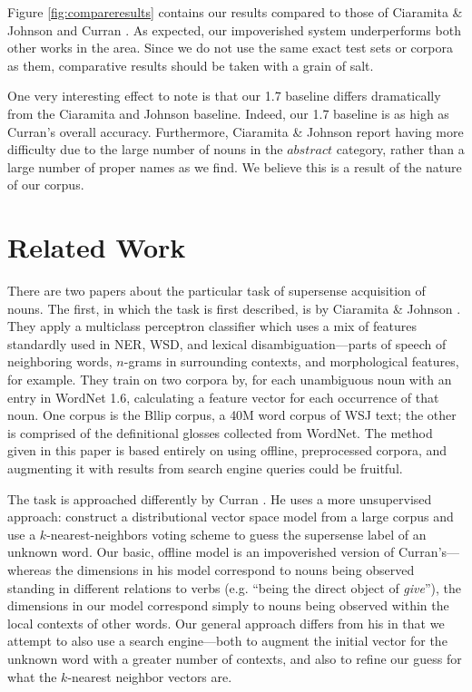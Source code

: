 \documentclass{article}
\begin{document}
Figure \ref{fig:compareresults} contains our results compared to those of Ciaramita \& Johnson \cite{cj} and Curran \cite{curran}.
As expected, our impoverished system underperforms both other works in the area.
Since we do not use the same exact test sets or corpora as them, comparative results should be taken with a grain of salt.

One very interesting effect to note is that our 1.7 baseline differs dramatically from the Ciaramita and Johnson baseline. 
Indeed, our 1.7 baseline is as high as Curran's overall accuracy.
Furthermore, Ciaramita \& Johnson report having more difficulty due to the large number of nouns in the $abstract$ category, rather than a large number of proper names as we find.
We believe this is a result of the nature of our corpus.


\section{Related Work}


There are two papers about the particular task of supersense acquisition of nouns.
The first, in which the task is first described, is by Ciaramita \& Johnson \cite{cj}.
They apply a multiclass perceptron classifier which uses a mix of features standardly used in NER, WSD, and lexical disambiguation---parts of speech of neighboring words, $n$-grams in surrounding contexts, and morphological features, for example.
They train on two corpora by, for each unambiguous noun with an entry in WordNet 1.6, calculating a feature vector for each occurrence of that noun.
One corpus is the Bllip corpus, a 40M word corpus of WSJ text; the other is comprised of the definitional glosses collected from WordNet.
The method given in this paper is based entirely on using offline, preprocessed corpora, and augmenting it with results from search engine queries could be fruitful.

The task is approached differently by Curran \cite{curran}.
He uses a more unsupervised approach: construct a distributional vector space model from a large corpus and use a $k$-nearest-neighbors voting scheme to guess the supersense label of an unknown word.
Our basic, offline model is an impoverished version of Curran's---whereas the dimensions in his model correspond to nouns being observed standing in different relations to verbs (e.g. ``being the direct object of {\it give}''), the dimensions in our model correspond simply to nouns being observed within the local contexts of other words.
Our general approach differs from his in that we attempt to also use a search engine---both to augment the initial vector for the unknown word with a greater number of contexts, and also to refine our guess for what the $k$-nearest neighbor vectors are.
\end{document}
